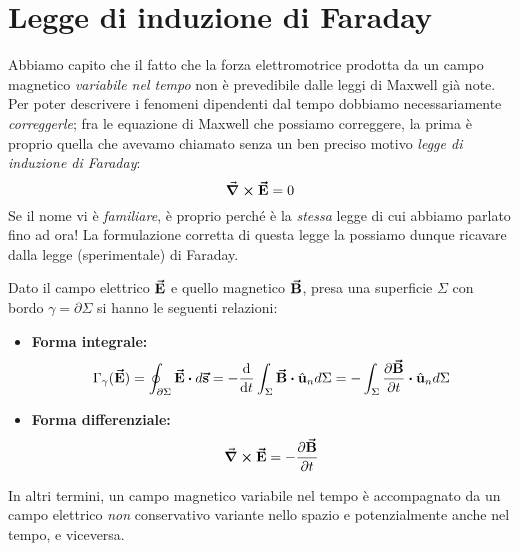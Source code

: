 \section{Legge di induzione di Faraday}
Abbiamo capito che il fatto che la forza elettromotrice prodotta da un campo magnetico \textit{variabile nel tempo} non è prevedibile dalle leggi di Maxwell già note. Per poter descrivere i fenomeni dipendenti dal tempo dobbiamo necessariamente \textit{correggerle}; fra le equazione di Maxwell che possiamo correggere, la prima è proprio quella che avevamo chiamato senza un ben preciso motivo \textit{legge di induzione di Faraday}:
\begin{equation*}
	\curl{\vb*{\va{E}}}=0
\end{equation*}
Se il nome vi è \textit{familiare}, è proprio perché è la \textit{stessa} legge di cui abbiamo parlato fino ad ora! La formulazione corretta di questa legge la possiamo dunque ricavare dalla legge (sperimentale) di Faraday.
\begin{theorema}
	Dato il campo elettrico $\vb*{\va{E}}$ e quello magnetico $\vb*{\va{B}}$, presa una superficie $\Sigma$ con bordo $\gamma=\partial \Sigma$ si hanno le seguenti relazioni:
	\begin{itemize}
		\item \textbf{Forma integrale:}
		\begin{equation}
			\Gamma_{\gamma}(\vba{E})=\oint_{\partial \Sigma} \vba{E}\vdot d\vba{s}=-\dv{t}\int_{\Sigma}\vba{B}\vdot\vbh{u}_nd\Sigma=-\int_{\Sigma}\pdv{\vba{B}}{t}\vdot\vbh{u}_nd\Sigma\label{LeggeFaradayIntegrale}
		\end{equation}
		\item \textbf{Forma differenziale:}
		\begin{equation}
			\curl{\vb*{\va{E}}}=-\pdv{\vb*{\va{B}}}{t}\label{LeggeFaradayDifferenziale}
		\end{equation}
	\end{itemize}
	In altri termini, un campo magnetico variabile nel tempo è accompagnato da un campo elettrico \textit{non} conservativo variante nello spazio e potenzialmente anche nel tempo, e viceversa.
\end{theorema}
